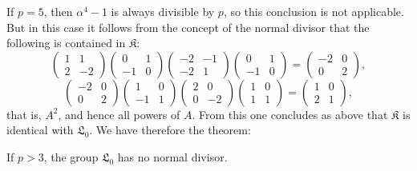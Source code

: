 \documentclass[11pt]{article}
\newcommand{\Lzero}{\mathfrak L_0}
\newcommand{\Kgrp}{\mathfrak K}
\begin{document}
If $p=5$, then $\alpha^4-1$ is always divisible by $p$, so this conclusion is not applicable. But in this case it follows from the concept of the normal divisor that the following is contained in $\Kgrp$:
\[
\begin{pmatrix}1&1\\2&-2\end{pmatrix}
\begin{pmatrix}0&1\\-1&0\end{pmatrix}
\begin{pmatrix}-2&-1\\-2&1\end{pmatrix}
\begin{pmatrix}0&1\\-1&0\end{pmatrix}
=\begin{pmatrix}-2&0\\0&2\end{pmatrix},
\]
\[
\begin{pmatrix}-2&0\\0&2\end{pmatrix}
\begin{pmatrix}1&0\\-1&1\end{pmatrix}
\begin{pmatrix}2&0\\0&-2\end{pmatrix}
\begin{pmatrix}1&0\\1&1\end{pmatrix}
=\begin{pmatrix}1&0\\2&1\end{pmatrix},
\]
that is, $A^2$, and hence all powers of $A$. From this one concludes as above that $\Kgrp$ is identical with $\Lzero$. We have therefore the theorem:

If $p>3$, the group $\Lzero$ has no normal divisor.
\end{document}
